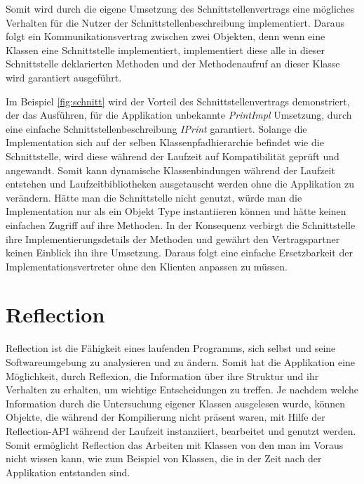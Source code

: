   Somit wird durch die eigene Umsetzung des Schnittstellenvertrags eine mögliches Verhalten für die Nutzer der Schnittstellenbeschreibung implementiert. Daraus folgt ein Kommunikationsvertrag zwischen zwei Objekten, denn wenn eine Klassen eine Schnittstelle implementiert, implementiert diese alle in dieser Schnittstelle deklarierten Methoden und der Methodenaufruf an dieser Klasse wird garantiert ausgeführt.\bigbreak 
  
  Im Beispiel \ref{fig:schnitt} wird der Vorteil des Schnittstellenvertrags demonstriert, der das Ausführen, für die Applikation unbekannte \textit{PrintImpl} Umsetzung, durch eine einfache Schnittstellenbeschreibung \textit{IPrint} garantiert. Solange die Implementation sich auf der selben Klassenpfadhierarchie befindet wie die Schnittstelle, wird diese während der Laufzeit auf Kompatibilität geprüft und angewandt. Somit kann dynamische Klassenbindungen während der Laufzeit entstehen und Laufzeitbibliotheken ausgetauscht werden ohne die Applikation zu verändern. Hätte man die Schnittstelle nicht genutzt, würde man die Implementation nur als ein Objekt Type instantiieren können und hätte keinen einfachen Zugriff auf ihre Methoden. In der Konsequenz verbirgt die Schnittstelle ihre Implementierungsdetails der Methoden und gewährt den Vertragspartner keinen Einblick ihn ihre Umsetzung. Daraus folgt eine einfache Ersetzbarkeit der Implementationsvertreter ohne den Klienten anpassen zu müssen.  

\section{Reflection}\label{sec:refl}

  Reflection ist die Fähigkeit eines laufenden Programms, sich selbst und seine Softwareumgebung zu analysieren und zu ändern. 
  Somit hat die Applikation eine Möglichkeit, durch Reflexion, die Information über ihre Struktur und ihr Verhalten zu erhalten, um wichtige Entscheidungen zu treffen. Je nachdem welche Information durch die Untersuchung eigener Klassen ausgelesen wurde, können Objekte, die während der Kompilierung nicht präsent waren, mit Hilfe der Reflection-API während der Laufzeit instanziiert, bearbeitet und genutzt werden. Somit ermöglicht Reflection das Arbeiten mit Klassen von den man im Voraus nicht wissen kann, wie zum Beispiel von Klassen, die in der Zeit nach der Applikation entstanden sind.\bigbreak 

